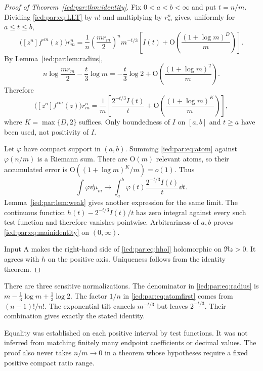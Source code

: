 \documentclass[11pt,letterpaper]{article}
\theoremstyle{remark}\newtheorem{remark}[theorem]{Remark}
\newcommand{\Oh}{\mathrm O}\newcommand{\supp}{\operatorname{supp}}
\newcommand{\coef}[1]{[z^{#1}]}
\begin{document}
\begin{proof}[Proof of Theorem~\ref{ied:par:thm:identity}]
Fix $0<a<b<\infty$ and put $t=n/m$. Dividing \eqref{ied:par:eq:LLT} by $n!$
and multiplying by $r_m^n$ gives, uniformly for $a\le t\le b$,
\begin{equation}\label{ied:par:eq:atomfirst}
 \bigl(\coef n f^{\circ m}(z)\bigr)r_m^n
 =\frac1n\left(\frac{mr_m}{2}\right)^n m^{-t/3}
 \left[I(t)+\Oh\!\left(\frac{(1+\log m)^D}{m}\right)\right].
\end{equation}
By Lemma~\ref{ied:par:lem:radius},
\[
 n\log\frac{mr_m}{2}-\frac t3\log m
 =-\frac t3\log2+
 \Oh\!\left(\frac{(1+\log m)^2}{m}\right).
\]
Therefore
\begin{equation}\label{ied:par:eq:atom}
 \bigl(\coef n f^{\circ m}(z)\bigr)r_m^n
 =\frac1m\left[
 \frac{2^{-t/3}I(t)}t+
 \Oh\!\left(\frac{(1+\log m)^K}{m}\right)\right],
\end{equation}
where $K=\max\{D,2\}$ suffices. Only boundedness of $I$ on $[a,b]$
and $t\ge a$ have been used, not positivity of $I$.

Let $\varphi$ have compact support in $(a,b)$. Summing
\eqref{ied:par:eq:atom} against $\varphi(n/m)$ is a Riemann sum.
There are $\Oh(m)$ relevant atoms, so their accumulated error is
$\Oh((1+\log m)^K/m)=o(1)$. Thus
\[
 \int\varphi\dd\mu_m\longrightarrow
 \int_a^b\varphi(t)\frac{2^{-t/3}I(t)}t\dd t.
\]
Lemma~\ref{ied:par:lem:weak} gives another expression for the same limit.
The continuous function $h(t)-2^{-t/3}I(t)/t$ has zero integral against
every such test function and therefore vanishes pointwise.
Arbitrariness of $a,b$ proves \eqref{ied:par:eq:mainidentity} on $(0,\infty)$.

Input A makes the right-hand side of \eqref{ied:par:eq:hhol} holomorphic
on $\Re z>0$. It agrees with $h$ on the positive axis.
Uniqueness follows from the identity theorem.
\end{proof}

There are three sensitive normalizations. The denominator in
\eqref{ied:par:eq:radius} is $m-\frac13\log m+\frac13\log2$.
The factor $1/n$ in \eqref{ied:par:eq:atomfirst} comes from $(n-1)!/n!$.
The exponential tilt cancels $m^{-t/3}$ but leaves $2^{-t/3}$.
Their combination gives exactly the stated identity.

Equality was established on each positive interval by test functions.
It was not inferred from matching finitely many endpoint coefficients
or decimal values. The proof also never takes $n/m\to0$ in a theorem
whose hypotheses require a fixed positive compact ratio range.
\end{document}
